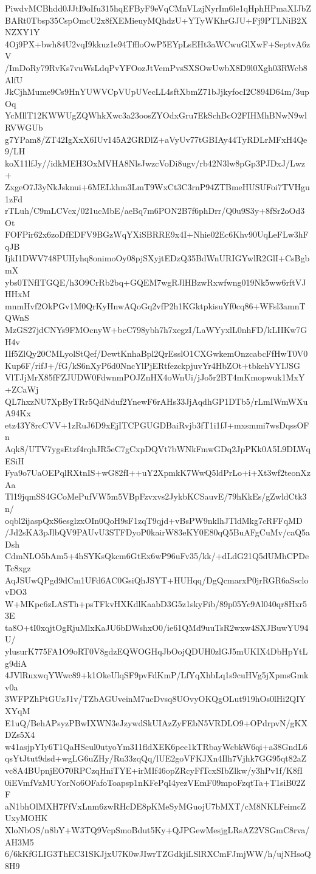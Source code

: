 PiwdvMCBhdd0JJtI9oIfu315hqEFByF9eVqCMnVLzjNyrIm6le1qHphHPmaXIJbZ
BARt0Tbsp35CspOmcU2x8fXEMieuyMQhdzU+YTyWKhrGJU+Fj9PTLNiB2XNZXY1Y
4Oj9PX+bwh84U2vqI9kkuz1e94TffloOwP5EYpLsEHt3aWCwuGlXwF+SeptvA6zV
/ImDoRy79RvKs7vuWsLdqPvYFOozJtVemPvsSXSOwUwbX8D9l0Xgh03RWcb8AlfU
JkCjhMume9Cs9HnYUWVCpVUpUVecLL4sftXbmZ71bJjkyfocI2C894D64m/3upOq
YcMllT12KWWUgZQWhkXwc3a23oosZYOdxGru7EkSchBcO2FIHMhBNwN9wlRVWGUb
g7YPam8/ZT42IgXxX6IUv145A2GRDlZ+aVyUv77tGBIAy44TyRDLrMFxH4Qe9/LH
koX11lfJy//idkMEH3OxMVHA8NlsJwzcVoDi8ugv/rb42N3lw8pGp3PJDxJ/Lwz+
ZxgeO7J3yNkJsknui+6MELkhm3LmT9WxCt3C3rnP94ZTBmeHUSUFoi7TVHgu1zFd
rTLuh/C9mLCVcx/021ucMbE/aeBq7m6PON2B7f6phDrr/Q0u9S3y+8fSr2oOd3Ot
FOFPir62x6zoDfEDFV9BGzWqYXiSBRRE9x4I+Nhie02Ec6Khv90UqLeFLw3hFqJB
IjkI1DWV748PUHyhq8onimoOy08pjSXyjtEDzQ35BdWnURIGYwlR2GlI+CsBgbmX
ybs0TNfITGQE/h3O9CrRb2bq+GQEM7wgRJlHBzwRxwfwng019Nk5ww6rftVJHHxM
mnmHvf2OkPGv1M0QrKyHnwAQoGq2vfP2h1KGktpkisuYf0cq86+WFsl3amnTQWnS
MzGS27jdCNYs9FMOcnyW+bcC798ybh7h7xegzI/LaWYyxlL0nhFD/kLIIKw7GH4v
IIf5ZlQy20CMLyolStQef/DewtKnhaBpl2QrEsslO1CXGwkemOnzcabcFfHwT0V0
Kup6F/rifJ+/fG/kS6nXyP6d0NncYlPjERtfezckpjuvYr4HbZOt+tbkehVYIJSG
VlTJjMrX85fFZJUDW0FdwnmPOJZnHX4oWnUi/jJo5r2BT4mKmopwuk1MxY+ZCaWj
QL7hxzNU7XpByTRr5QdNduf2YnewF6rAHs33JjAqdhGP1DTb5/rLmIWmWXuA94Kx
etz43Y8rcCVV+1zRuJ6D9xEjITCPGUGDBaiRvjb3fT1i1fJ+mxsmmi7wsDqssOFn
Aqk8/UTV7ygsEtzf4rqhJR5eC7gCxpDQVt7bWNkFmwGDq2JpPKk0A5L9DLWqESiH
Fya9o7UaOEPqlRXtnIS+wG82fI++uY2XpmkK7WwQ5ldPrLo+i+Xt3wf2teonXzAa
Tl19jqmSS4GCoMePufVW5m5VBpFzvxvs2JykbKCSauvE/79hKkEs/gZwldCtk3n/
oqbl2ijaspQxS6esglzxOIn0QoH9sF1zqT9qjd+vBsPW9nklhJTldMkg7cRFFqMD
/Jd2sKA3pJlbQV9PAUvU3STFDyoP0kairW83eKY0E80qQ5BuAFgCuMv/caQ5aDsh
CdmNLO5bAm5+4hSYKsQkcm6GtEx6wP96uFv35/kk/+dLdG21Q5dUMhCPDeTc8xgz
AqJSUwQPgd9dCm1UFd6AC0GsiQhJSYT+HUHqq/DgQcmarxP0jrRGR6aSsclovDO3
W+MKpc6zLASTh+psTFkvHXKdlKaabD3G5z1skyFib/89p05Yc9Al040qr8Hxr53E
ta8O+tI0xqjtOgRjuMlxKaJU6bDWshxO0/ie61QMd9uuTsR2wxw4SXJBuwYU94U/
ylusurK775FA1O9oRT0V8gdzEQWOGHqJbOojQDUH0zlGJ5mUKIX4DbHpYtLg9diA
4JVlRuxwqYWwc89+k1OkeUlqSF9pvFdKmP/LfYqXhbLq1s9cuHVg5jXpmsGmkv0a
3WFPZhPtGUzJ1v/TZbAGUveinM7ucDvsq8UOvyOKQgOLut919hOs0lHi2QIYXYqM
E1uQ/BehAPsyzPBwIXWN3eJzywdSkUIAzZyFEbN5VRDLO9+OPdrpvN/gKXDZs5X4
w41asjpYIy6T1QaHScul0utyoYm311fldXEK6pec1kTRbayWcbkW6qi+a38GndL6
qsYtJtut9dsd+wgLG6uZHy/Ru33zqQq/lUE2goVFKJXn4Ilh7Vjhk7GG95qt82aZ
vc8A4BUpnjEO70RPCzqHniTYE+irMIf46opZRcyFfTcxSIbZlkw/y3hPv1f/K8fI
0iEVmfVzMUYorNo6OFafoToapsp1nKFePqI4yezVEmF09mpoFzqtTa+T1siB02ZF
aN1bhOlMXH7FfVxLnm6zwRHcDE8pKMeSyMGuojU7bMXT/cM8NKLFeimcZUxyMOHK
XloNbOS/n8bY+W3TQ9VcpSmoBdut5Ky+QJPGewMesjgLRsAZ2VSGmC8rva/AH3M5
6/6kKfGLIG3ThEC31SKJjxU7K0wJIwrTZGdkjiLSlRXCmFJmjWW/h/ujNHsoQ8H9

